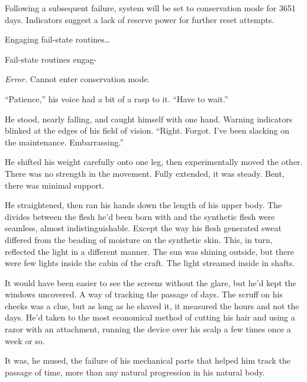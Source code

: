 Following a subsequent failure, system will be set to conservation mode for 3651 days.  Indicators suggest a lack of reserve power for further reset attempts.



Engaging fail-state routines\ldots



Fail-state routines engag-



\emph{Error.  }Cannot enter conservation mode.



\sectionbreak



``Patience,'' his voice had a bit of a rasp to it.  ``Have to wait.''



He stood, nearly falling, and caught himself with one hand.  Warning indicators blinked at the edges of his field of vision.  ``Right.  Forgot.  I've been slacking on the maintenance.  Embarrassing.''



He shifted his weight carefully onto one leg, then experimentally moved the other.  There was no strength in the movement.  Fully extended, it was steady.  Bent, there was minimal support.



He straightened, then ran his hands down the length of his upper body.  The divides between the flesh he'd been born with and the synthetic flesh were seamless, almost indistinguishable.  Except the way his flesh generated sweat differed from the beading of moisture on the synthetic skin.  This, in turn, reflected the light in a different manner.  The sun was shining outside, but there were few lights inside the cabin of the craft.  The light streamed inside in shafts.



It would have been easier to see the screens without the glare, but he'd kept the windows uncovered.  A way of tracking the passage of days.  The scruff on his cheeks was a clue, but as long as he shaved it, it measured the hours and not the days.  He'd taken to the most economical method of cutting his hair and using a razor with an attachment, running the device over his scalp a few times once a week or so.



It was, he mused, the failure of his mechanical parts that helped him track the passage of time, more than any natural progression in his natural body.



